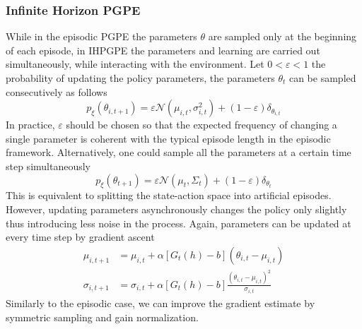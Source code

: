 \subsubsection{Infinite Horizon PGPE}
While in the episodic PGPE the parameters $\theta$ are sampled only at the beginning of each episode, in \gls{IHPGPE} \cite{sehnke2012parameter} the parameters and learning are carried out simultaneously, while interacting with the environment. Let $0 < \varepsilon < 1$ the probability of updating the policy parameters, the parameters $\theta_t$ can be sampled consecutively as follows
\begin{equation}
	p_\xi(\theta_{i,t+1}) = \varepsilon \mathcal{N}(\mu_{i,t}, \sigma_{i,t}^2) 
							+ (1-\varepsilon) \delta_{\theta_{i,t}}
\end{equation}
In practice, $\varepsilon$ should be chosen so that the expected frequency of
changing a single parameter is coherent with the typical episode length in the
episodic framework. Alternatively, one could sample all the parameters at a
certain time step simultaneously
\begin{equation}
	p_\xi(\theta_{t+1}) = \varepsilon \mathcal{N}(\mu_{t}, \Sigma_t) 
							+ (1-\varepsilon) \delta_{\theta_{t}}
\end{equation}
This is equivalent to splitting the state-action space into artificial
episodes. However, updating parameters asynchronously changes the policy only
slightly thus introducing less noise in the process. Again, parameters can be
updated at every time step by gradient ascent
\begin{equation}
	\begin{split}
		\mu_{i,t+1} &= \mu_{i,t} + \alpha \left[G_t(h) - b\right] (\theta_{i,t}
		- \mu_{i,t})\\
		\sigma_{i,t+1} &= \sigma_{i,t} + \alpha \left[G_t(h) - b\right] 
		\frac{(\theta_{i,t} -\mu_{i,t})^2}{\sigma_{i,t}}
	\end{split}
\end{equation}
Similarly to the episodic case, we can improve the gradient estimate by
symmetric sampling and gain normalization. 